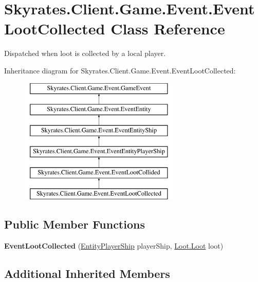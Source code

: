 \hypertarget{class_skyrates_1_1_client_1_1_game_1_1_event_1_1_event_loot_collected}{\section{Skyrates.\-Client.\-Game.\-Event.\-Event\-Loot\-Collected Class Reference}
\label{class_skyrates_1_1_client_1_1_game_1_1_event_1_1_event_loot_collected}
}


Dispatched when loot is collected by a local player.  


Inheritance diagram for Skyrates.\-Client.\-Game.\-Event.\-Event\-Loot\-Collected\-:\begin{figure}[H]
\begin{center}
\leavevmode
\includegraphics[height=6.000000cm]{class_skyrates_1_1_client_1_1_game_1_1_event_1_1_event_loot_collected}
\end{center}
\end{figure}
\subsection*{Public Member Functions}
\begin{DoxyCompactItemize}
\item 
\hypertarget{class_skyrates_1_1_client_1_1_game_1_1_event_1_1_event_loot_collected_a57811ed7da0562397ff808b1d7e7d798}{{\bfseries Event\-Loot\-Collected} (\hyperlink{class_skyrates_1_1_client_1_1_entity_1_1_entity_player_ship}{Entity\-Player\-Ship} player\-Ship, \hyperlink{class_skyrates_1_1_client_1_1_loot_1_1_loot}{Loot.\-Loot} loot)}\label{class_skyrates_1_1_client_1_1_game_1_1_event_1_1_event_loot_collected_a57811ed7da0562397ff808b1d7e7d798}

\end{DoxyCompactItemize}
\subsection*{Additional Inherited Members}


